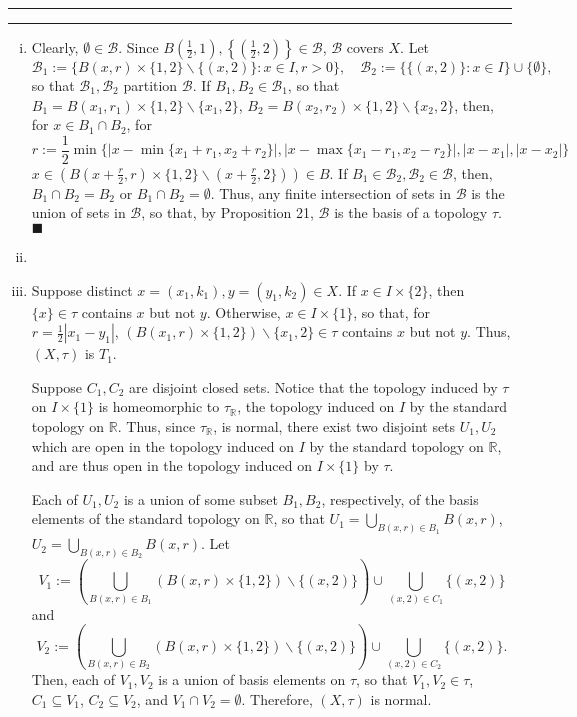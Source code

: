 \documentclass[11pt]{article}
\newcounter{questionCounter}
\newcounter{partCounter}[questionCounter]
\newenvironment{question}[2][\arabic{questionCounter}]{%
    \setcounter{partCounter}{0}%
    \vspace{.25in} \hrule \vspace{0.5em}%
        \noindent{\bf #2}%
    \vspace{0.8em} \hrule \vspace{.10in}%
    \addtocounter{questionCounter}{1}%
}{}
\renewcommand{\qed}{\quad $\blacksquare$}
\newcommand{\B}{\mathcal{B}}
\newcommand{\sminus}{\backslash}
\newcommand{\R}{\mathbb{R}} %
\begin{document}
\begin{question}{Problem 4}
\begin{enumerate}[(i)]
\item Clearly, $\emptyset \in \B$.
Since
$B\left( \frac12,1 \right), \left\{ \left( \frac12,2 \right) \right\} \in \B$,
$\B$ covers $X$. Let
\[\B_1 := \{B(x,r) \times \{1,2\} \sminus \{(x,2)\} : x \in I, r > 0\},
  \quad
  \B_2 := \{\{(x,2)\} : x \in I\} \cup \{\emptyset\},\]
so that $\B_1,\B_2$ partition $\B$.
If $B_1,B_2 \in \B_1$, so that
$B_1 = B(x_1,r_1) \times \{1,2\} \sminus \{x_1,2\}$,
$B_2 = B(x_2,r_2) \times \{1,2\} \sminus \{x_2,2\}$, then, for
$x \in B_1 \cap B_2$, for
\[r
  := \frac12\min\{
    |x - \min\{x_1 + r_1, x_2 + r_2\}|,
    |x - \max\{x_1 - r_1, x_2 - r_2\}|,
    |x - x_1|,
    |x - x_2|
  \}
\]
$x
 \in (B(x + \frac{r}{2}, r) \times \{1,2\} \sminus (x + \frac{r}{2},2\}))
 \in B$.
If $B_1 \in \B_2, \B_2 \in \B$, then, $B_1 \cap B_2 = B_2$ or
$B_1 \cap B_2 = \emptyset$.
Thus, any finite intersection of sets in $\B$ is the union of sets in $\B$,
so that, by Proposition 21, $\B$ is the basis of a topology $\tau$. \qed

\item

\item Suppose distinct $x = (x_1,k_1),y = (y_1,k_2) \in X$. If
$x \in I \times \{2\}$, then $\{x\} \in \tau$ contains $x$ but not $y$.
Otherwise, $x \in I \times \{1\}$, so that, for $r = \frac12 |x_1 - y_1|$,
$(B(x_1,r) \times \{1,2\}) \sminus \{x_1,2\} \in \tau$ contains $x$ but not
$y$. Thus, $(X,\tau)$ is $T_1$.

Suppose $C_1,C_2$ are disjoint closed sets. Notice that
the topology induced by $\tau$ on $I \times \{1\}$ is homeomorphic to
$\tau_{\R}$, the topology induced on $I$ by the standard topology on $\R$.
Thus, since $\tau_{\R}$, is normal, there exist two disjoint sets $U_1,U_2$
which are open in the topology induced on $I$ by the standard topology on
$\R$, and are thus open in the topology induced on $I \times \{1\}$ by $\tau$.

Each of $U_1,U_2$ is a union of some subset $B_1,B_2$, respectively, of the
basis elements of the standard topology on $\R$, so that
$U_1 = \bigcup_{B(x,r) \in B_1} B(x,r)$,
$U_2 = \bigcup_{B(x,r) \in B_2} B(x,r)$. Let
\[V_1 :=
 \left(
    \bigcup_{B(x,r) \in B_1} (B(x,r) \times \{1,2\}) \sminus \{(x,2)\}
 \right)
      \cup \bigcup_{(x,2) \in C_1} \{(x,2)\}\]
and
\[V_2 :=
 \left(
    \bigcup_{B(x,r) \in B_2} (B(x,r) \times \{1,2\}) \sminus \{(x,2)\}
 \right)
      \cup \bigcup_{(x,2) \in C_2} \{(x,2)\}.\]
Then, each of $V_1,V_2$ is a union of basis elements on $\tau$, so that
$V_1,V_2 \in \tau$, $C_1 \subseteq V_1$, $C_2 \subseteq V_2$, and
$V_1 \cap V_2 = \emptyset$. Therefore, $(X,\tau)$ is normal.


\end{enumerate}
\end{question}
\end{document}
